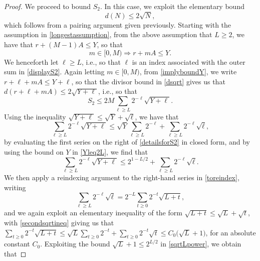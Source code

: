 \documentclass[12pt]{article}
\begin{document}
\begin{proof}
 We proceed to bound $S_2$. In this case, we exploit the elementary bound
\begin{equation}\label{dsqrt}
 d(N) \leq 2 \sqrt{N}, 
\end{equation}
 which follows from a pairing argument given previously. Starting with the assumption in \eqref{longestassumption}, from the above 
 assumption that $L \geq 2$, we have that $ r + (M-1) A \leq Y$, so that 
\begin{equation}\label{implyboundY}
 m \in [0, M) \Longrightarrow r + m A \leq Y. 
\end{equation}
 We henceforth let $\ell \geq L$, i.e., so that $\ell$ is an index associated with the outer sum in \eqref{displayS2}. Again letting $m \in [0, 
 M)$, from \eqref{implyboundY}, we write $r + \ell + m A \leq Y + \ell$, so that the divisor bound in \eqref{dsqrt} gives us that $ d(r + 
 \ell + m A) \leq 2 \sqrt{Y + \ell}$, i.e., so that 
\begin{equation}\label{S2elementary}
 S_{2} \leq 2 M \sum_{\ell \geq L} 2^{-\ell} \sqrt{Y + \ell}. 
\end{equation}
 Using the inequality $\sqrt{Y + \ell} \leq \sqrt{Y} + \sqrt{\ell}$, we have that 
\begin{equation}\label{detailsforS2}
 \sum_{\ell \geq L} 2^{-\ell} \sqrt{Y + \ell}
 \leq \sqrt{Y} \sum_{\ell \geq L} 2^{-\ell} + \sum_{\ell \geq L} 2^{-\ell} \sqrt{\ell}, 
\end{equation}
 by evaluating the first series on the right of \eqref{detailsforS2} in closed form, and by using the bound on $Y$ in \eqref{Yleq2L}, we 
 find that 
\begin{equation}\label{toreindex}
 \sum_{\ell \geq L} 2^{-\ell} \sqrt{Y + \ell}
 \leq 2^{1 - L/2} + \sum_{\ell \geq L} 2^{-\ell} \sqrt{\ell}. 
\end{equation}
 We then apply a reindexing argument to the right-hand series in \eqref{toreindex}, writing
\begin{equation}\label{secondsqrtineq}
 \sum_{\ell \geq L} 2^{-\ell} \sqrt{\ell} = 
 2^{-L} \sum_{t \geq 0} 2^{-t} \sqrt{L + t}, 
\end{equation}
 and we again exploit an elementary inequality of the form $\sqrt{L + t} \leq \sqrt{L} + \sqrt{t}$, with \eqref{secondsqrtineq} giving us 
 that $ \sum_{t \geq 0} 2^{-t} \sqrt{L + t} \leq \sqrt{L} \sum_{t \geq 0} 2^{-t} + \sum_{t \geq 0} 2^{-t} \sqrt{t} 
 \leq C_0 \big( \sqrt{L} + 1 \big)$, 
 for an absolute constant $C_0$. 
 Exploiting the bound 
$\sqrt{L} + 1 \leq 2^{L/2}$ in \eqref{sqrtLpower}, we obtain that 

\end{proof}
\end{document}
